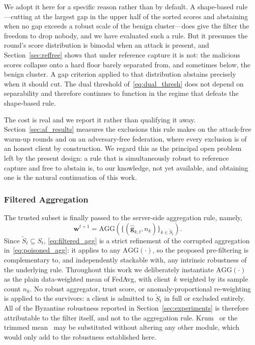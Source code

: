 \documentclass[journal]{IEEEtran}
\begin{document}
We adopt it here for a specific reason rather than by default. A shape-based rule---cutting at the largest gap in the upper half of the sorted scores and abstaining when no gap exceeds a robust scale of the benign cluster---does give the filter the freedom to drop nobody, and we have evaluated such a rule. But it presumes the round's score distribution is bimodal when an attack is present, and Section~\ref{sec:reffree} shows that under reference capture it is not: the malicious scores collapse onto a hard floor barely separated from, and sometimes below, the benign cluster. A gap criterion applied to that distribution abstains precisely when it should cut. The dual threshold of~\eqref{eq:dual_thresh} does not depend on separability and therefore continues to function in the regime that defeats the shape-based rule.

The cost is real and we report it rather than qualifying it away. Section~\ref{sec:af_results} measures the exclusions this rule makes on the attack-free warm-up rounds and on an adversary-free federation, where every exclusion is of an honest client by construction. We regard this as the principal open problem left by the present design: a rule that is simultaneously robust to reference capture and free to abstain is, to our knowledge, not yet available, and obtaining one is the natural continuation of this work.

\subsubsection{Filtered Aggregation}
The trusted subset is finally passed to the server-side aggregation rule, namely,
\begin{equation}
\mathbf{w}^{t+1} = \text{AGG}\!\left(\{(\hat{\mathbf{g}}_{k,t}, n_k)\}_{k \in \widetilde{S}_t}\right).
\label{eq:filtered_agg}
\end{equation}
Since $\widetilde{S}_t \subseteq S_t$, \eqref{eq:filtered_agg} is a strict refinement of the corrupted aggregation in~\eqref{eq:poisoned_agg}: it applies to any $\text{AGG}(\cdot)$, so the proposed pre-filtering is complementary to, and independently stackable with, any intrinsic robustness of the underlying rule. Throughout this work we deliberately instantiate $\text{AGG}(\cdot)$ as the plain data-weighted mean of FedAvg, with client~$k$ weighted by its sample count $n_k$. No robust aggregator, trust score, or anomaly-proportional re-weighting is applied to the survivors: a client is admitted to $\widetilde{S}_t$ in full or excluded entirely. All of the Byzantine robustness reported in Section~\ref{sec:experiments} is therefore attributable to the filter itself, and not to the aggregation rule. Krum~\cite{blanchard2017machine} or the trimmed mean~\cite{yin2018byzantine} may be substituted without altering any other module, which would only add to the robustness established here.
\end{document}
